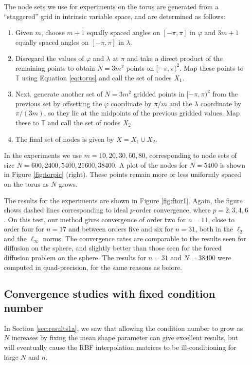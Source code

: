 \documentclass[smallextended]{svjour3}
\begin{document}
%
The node sets we use for experiments on the torus are generated from a ``staggered'' grid in intrinsic variable space, and are determined as follows:
%
\begin{enumerate}
\item Given $m$, choose $m+1$ equally spaced angles on $[-\pi,\pi]$ in $\varphi$ and $3m+1$ equally spaced angles on $[-\pi,\pi]$ in $\lambda$.
\item Disregard the values of $\varphi$ and $\lambda$ at $\pi$ and take a direct product of the remaining points to obtain $N = 3m^2$ points on $[-\pi,\pi)^2$. Map these points to $\mathbb{T}$ using Equation \eqref{eq:torus} and call the set of nodes $X_1$.
\item Next, generate another set of $N=3m^2$ gridded points in $[-\pi,\pi)^2$ from the previous set by offsetting the $\varphi$ coordinate by $\pi/m$ and the $\lambda$ coordinate by $\pi/(3m)$, so they lie at the midpoints of the previous gridded values. Map these to $\mathbb{T}$ and call the set of nodes $X_2$.
\item The final set of nodes is given by $X=X_1 \cup X_2$.  
\end{enumerate}
%
In the experiments we use $m=10, 20, 30, 60, 80$, corresponding to node sets of size $N = 600, 2400, 5400, 21600, 38400$.  A plot of the nodes for $N=5400$ is shown in Figure \ref{fig:torpic} (right).  These points remain more or less uniformly spaced on the torus as $N$ grows.

The results for the experiments are shown in Figure \ref{fig:ftor1}. Again, the figure shows dashed lines corresponding to ideal $p$-order convergence, where $p = 2,3,4,6$. On this test, our method gives convergence of order two for $n=11$, close to order four for $n = 17$ and between orders five and six for $n=31$, both in the $\ell_2$ and the $\ell_{\infty}$ norms. The convergence rates are comparable to the results seen for diffusion on the sphere, and slightly better than those seen for the forced diffusion problem on the sphere. The results for $n = 31$ and $N = 38400$ were computed in quad-precision, for the same reasons as before.

\subsection{Convergence studies with fixed condition number}
\label{sec:results1b}

In Section \ref{sec:results1a}, we saw that allowing the condition number to grow as $N$ increases by fixing the mean shape parameter can give excellent results, but will eventually cause the RBF interpolation matrices to be ill-conditioning for large $N$ and $n$.
\end{document}
